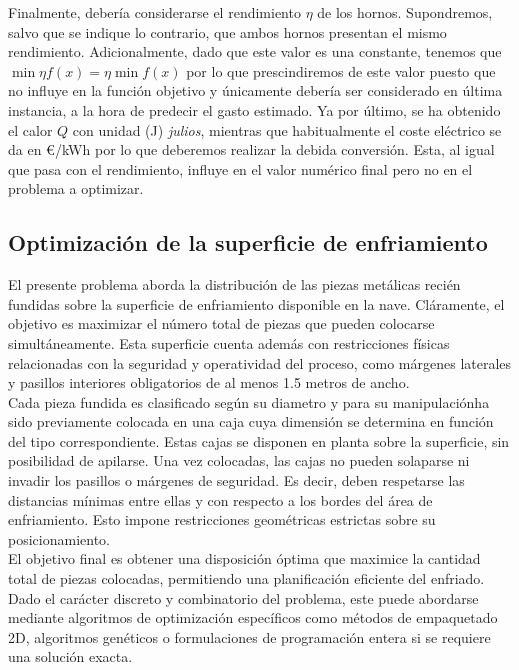 Finalmente, debería considerarse el rendimiento $\eta$ de los hornos. Supondremos, salvo que se indique lo contrario, que ambos hornos presentan el mismo rendimiento. Adicionalmente, dado que este valor es una constante, tenemos que $\min{\eta f(x)} = \eta \min{f(x)}$ por lo que prescindiremos de este valor puesto que no influye en la función objetivo y únicamente debería ser considerado en última instancia, a la hora de predecir el gasto estimado. Ya por último, se ha obtenido el calor $Q$ con unidad (J) \textit{julios}, mientras que habitualmente el coste eléctrico se da en \euro/kWh por lo que deberemos realizar la debida conversión. Esta, al igual que pasa con el rendimiento, influye en el valor numérico final pero no en el problema a optimizar.
%
%
\subsection{Optimización de la superficie de enfriamiento}
%
%
El presente problema aborda la distribución de las piezas metálicas recién fundidas sobre la superficie de enfriamiento disponible en la nave. Cláramente, el objetivo es maximizar el número total de piezas que pueden colocarse simultáneamente. Esta superficie cuenta además con restricciones físicas relacionadas con la seguridad y operatividad del proceso, como márgenes laterales y pasillos interiores obligatorios de al menos 1.5 metros de ancho.\\

Cada pieza fundida es clasificado según su diametro y para su manipulaciónha sido previamente colocada en una caja cuya dimensión se determina en función del tipo correspondiente. Estas cajas se disponen en planta sobre la superficie, sin posibilidad de apilarse. Una vez colocadas, las cajas no pueden solaparse ni invadir los pasillos o márgenes de seguridad. Es decir, deben respetarse las distancias mínimas entre ellas y con respecto a los bordes del área de enfriamiento. Esto impone restricciones geométricas estrictas sobre su posicionamiento.\\

El objetivo final es obtener una disposición óptima que maximice la cantidad total de piezas colocadas, permitiendo una planificación eficiente del enfriado. Dado el carácter discreto y combinatorio del problema, este puede abordarse mediante algoritmos de optimización específicos como métodos de empaquetado 2D, algoritmos genéticos o formulaciones de programación entera si se requiere una solución exacta.\\
%
%
